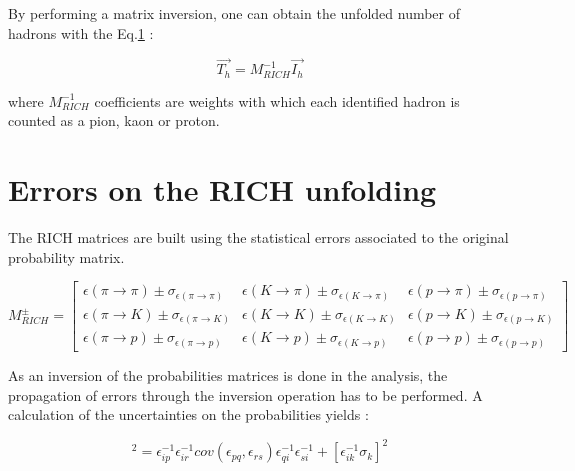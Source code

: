 By performing a matrix inversion, one can obtain the unfolded number of hadrons with the Eq.\ref{} :

\begin{equation}
  \overrightarrow{T_h} = M^{-1}_{RICH}\overrightarrow{I_h}
\end{equation}

where $M^{-1}_{RICH}$ coefficients are weights with which each identified hadron is counted as a pion, kaon
or proton.

\begin{table}
  \caption{}
  \label{}
\end{table}


\section{Errors on the RICH unfolding}

The RICH matrices are built using the statistical errors associated to the original probability matrix.

\begin{equation}
M^{\pm}_{RICH}
=
\begin{bmatrix}
\epsilon(\pi \rightarrow \pi)\pm\sigma_{\epsilon(\pi \rightarrow \pi)} & \epsilon(K \rightarrow \pi)\pm\sigma_{\epsilon(K \rightarrow \pi)} & \epsilon(p \rightarrow \pi)\pm\sigma_{\epsilon(p \rightarrow \pi)}\\
\epsilon(\pi \rightarrow K)\pm\sigma_{\epsilon(\pi \rightarrow K)} & \epsilon(K \rightarrow K)\pm\sigma_{\epsilon(K \rightarrow K)} & \epsilon(p \rightarrow K)\pm\sigma_{\epsilon(p \rightarrow K)} \\
\epsilon(\pi \rightarrow p)\pm\sigma_{\epsilon(\pi \rightarrow p)} & \epsilon(K \rightarrow p)\pm\sigma_{\epsilon(K \rightarrow p)} & \epsilon(p \rightarrow p)\pm\sigma_{\epsilon(p \rightarrow p)}
\end{bmatrix}
\end{equation}

As an inversion of the probabilities matrices is done in the analysis, the propagation of errors through the
inversion operation has to be performed. A calculation of the uncertainties on the probabilities yields \cite{} :

\begin{equation}
  [\sigma^{-1}_i]^2 = \epsilon^{-1}_{ip}\epsilon^{-1}_{ir}cov(\epsilon_{pq},\epsilon_{rs})\epsilon^{-1}_{qi}\epsilon^{-1}_{si} + [\epsilon^{-1}_{ik}\sigma_k]^2
\end{equation}


